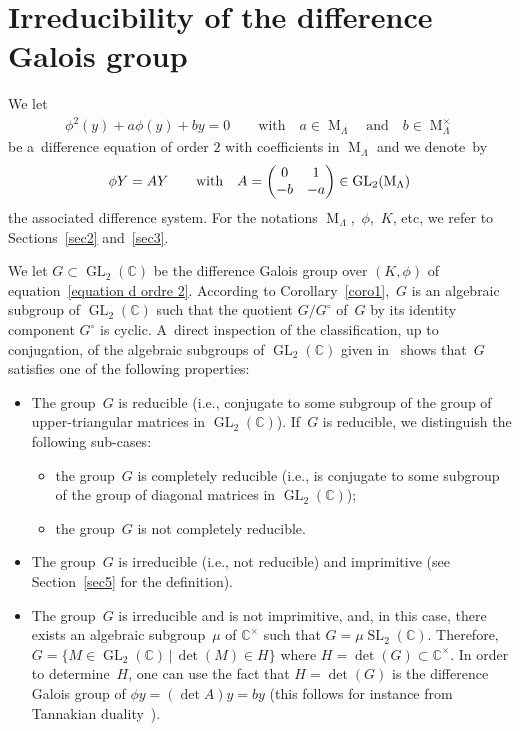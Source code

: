 \documentclass[10pt,a4paper]{amsart}
\numberwithin{equation}{section}
\begin{document}
\section{Irreducibility of the dif\/ference Galois group}
\label{sec4}
We let
\begin{gather}
\label{equation d ordre 2}
\phi^{2}(y) + a \phi(y)+by=0 \qquad \text{with} \quad a \in \operatorname{M}_{\Lambda} \quad \text{and} \quad b\in
\operatorname{M}_{\Lambda}^{\times}
\end{gather}
be a~dif\/ference equation of order $2$ with coef\/f\/icients in $\operatorname{M}_{\Lambda}$ and we denote~by
\begin{gather*}
\phi Y=AY \qquad \hbox{with} \quad A=
\begin{pmatrix}
0&1
\\
-b&-a
\end{pmatrix}
\in \operatorname{GL}_{2}(\operatorname{M}_{\Lambda})
\end{gather*}
the associated dif\/ference system.
For the notations $\operatorname{M}_{\Lambda}$,~$\phi$,~$K$, etc, we refer to Sections~\ref{sec2} and~\ref{sec3}.

We let $G \subset \operatorname{GL}_{2}(\mathbb C)$ be the dif\/ference Galois group over $(K,\phi)$ of
equation~\eqref{equation d ordre 2}.
According to Corollary~\ref{coro1},~$G$ is an algebraic subgroup of $\operatorname{GL}_{2}(\mathbb C)$ such that the
quotient $G/G^{\circ}$ of~$G$ by its identity component $G^{\circ}$ is cyclic.
A~direct inspection of the classif\/ication, up to conjugation, of the algebraic subgroups of
$\operatorname{GL}_{2}(\mathbb C)$ given in~\cite[Theorem~4]{NvdPT} shows that~$G$ satisf\/ies one of the following
properties:
\begin{itemize}
\itemsep=0pt
\item The group~$G$ is reducible (i.e., conjugate to some subgroup of the group of upper-triangular matrices in
$\operatorname{GL}_{2}(\mathbb C)$).
If~$G$ is reducible, we distinguish the following sub-cases:
\begin{itemize}\itemsep=0pt
\item the group~$G$ is completely reducible (i.e., is conjugate to some subgroup of the group of diagonal matrices
in $\operatorname{GL}_{2}(\mathbb C)$);
\item the group~$G$ is not completely reducible.
\end{itemize}
\item The group~$G$ is irreducible (i.e., not reducible) and imprimitive (see Section~\ref{sec5} for the def\/inition).
\item The group~$G$ is irreducible and is not imprimitive, and, in this case, there exists an algebraic subgroup~$\mu$
of $\mathbb C^{\times}$ such that $G= \mu \operatorname{SL}_{2}(\mathbb C)$.
Therefore, $G= \{M \in \operatorname{GL}_{2}(\mathbb C) \, \vert \, \det(M) \in H\}$ where $H=\det(G) \subset \mathbb
C^{\times}$.
In order to determine~$H$, one can use the fact that $H=\det(G)$ is the dif\/ference Galois group of $\phi y = (\det A) y
= by$ (this follows for instance from Tannakian duality~\cite[Section~1.4]{VdPS97}).
\end{itemize}
\end{document}
